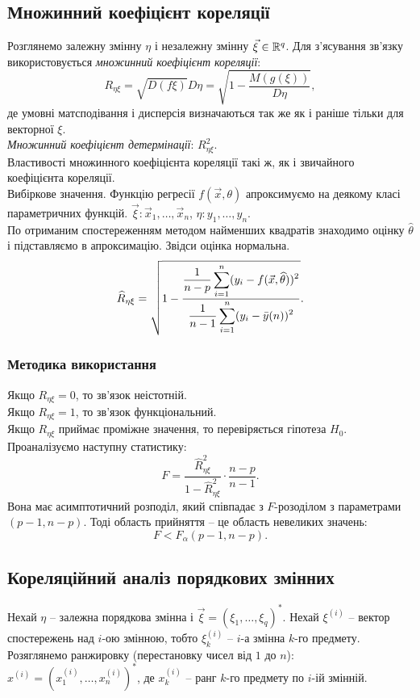 \subsection{Множинний коефіцієнт кореляції}

Розглянемо залежну змінну $\eta$ і незалежну змінну $\vec\xi\in\mathbb{R}^q$. Для з'ясування зв'язку
використовується \textit{множинний коефіцієнт кореляції}: \[R_{\eta\xi} = \sqrt{D(f\xi)}{D\eta}=\sqrt{1-\dfrac{M(g(\xi))}{D\eta}},\] де умовні матсподівання і дисперсія визначаються так же як і раніше тільки для векторної $\xi$. \\

\textit{Множинний коефіцієнт детермінації}: $R_{\eta\xi}^2$. \\

Властивості множинного коефіцієнта кореляції такі ж, як і звичайного коефіцієнта кореляції. \\

Вибіркове значення. Функцію регресії $f(\vec x,\theta)$ апроксимуємо на деякому класі параметричних функцій. $\vec\xi:\vec x_1, \ldots, \vec x_n$, $\eta: y_1, \ldots, y_n$. \\

По отриманим спостереженням методом найменших квадратів знаходимо оцінку $\widehat{\theta}$ і підставляємо в апроксимацію. Звідси оцінка нормальна. \[ \widehat{R}_{\eta\xi} = \sqrt{1 - \dfrac{\dfrac{1}{n-p}\displaystyle\sum\limits_{i=1}^n (y_i - f(\vec{x}, \widehat{\theta}))^2}{\dfrac{1}{n-1}\displaystyle\sum\limits_{i=1}^n(y_i-\bar{y}(n))^2}}.\]

\subsubsection{Методика використання}

Якщо $R_{\eta\xi} = 0$, то зв'язок неістотній. \\

Якщо $R_{\eta\xi} = 1$, то зв'язок функціональний. \\

Якщо $R_{\eta\xi}$ приймає проміжне значення, то перевіряється гіпотеза $H_0$. \\

Проаналізуємо наступну статистику: \[F = \dfrac{\widehat{R}_{\eta\xi}^2}{1-\widehat{R}_{\eta\xi}^2} \cdot \dfrac{n - p}{n - 1}.\] Вона має асимптотичний розподіл, який співпадає з $F$-розоділом з параметрами $(p-1,n-p)$. Тоді область прийняття -- це область невеликих значень: \[F < F_\alpha(p-1, n - p).\]

\subsection{Кореляційний аналіз порядкових змінних}

Нехай $\eta$ -- залежна порядкова змінна і $\vec \xi = (\xi_1, \ldots, \xi_q)^*$. Нехай $\xi^{(i)}$ -- вектор спостережень над $i$-ою змінною, тобто $\xi_k^{(i)}$ -- $i$-а змінна $k$-го предмету. \\

Розяглянемо ранжировку (перестановку чисел від $1$ до $n$): $x^{(i)} = \left(x_1^{(i)}, \ldots, x_n^{(i)}\right)^*$, де $x_k^{(i)}$ -- ранг $k$-го предмету по $i$-ій змінній. \\